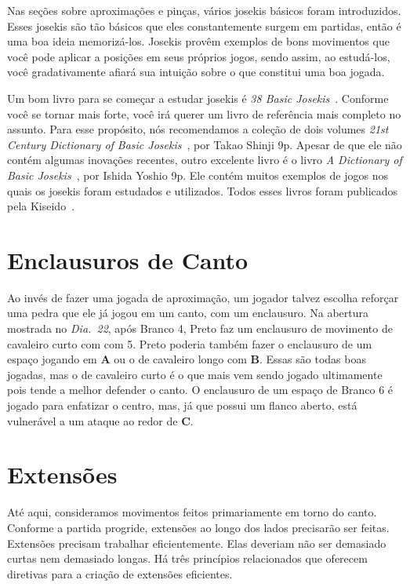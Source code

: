 Nas seções sobre aproximações e pinças, vários josekis básicos foram introduzidos. Esses josekis são tão básicos que eles constantemente surgem em partidas, então é uma boa ideia memorizá-los. Josekis provêm exemplos de bons movimentos que você pode aplicar a posições em seus próprios jogos, sendo assim, ao estudá-los, você gradativamente afiará sua intuição sobre o que constitui uma boa jogada.

Um bom livro para se começar a estudar josekis é \emph{38 Basic Josekis}~\cite{kosugi_bozulich_38_basic_joseki}. Conforme você se tornar mais forte, você irá querer um livro de referência mais completo no assunto. Para esse propósito, nós recomendamos a coleção de dois volumes \emph{21st Century Dictionary of Basic Josekis}~\cite{takao_shinji_21st_century_joseki_dictionary}, por Takao Shinji 9p. Apesar de que ele não contém algumas inovações recentes, outro excelente livro é o livro \emph{A Dictionary of Basic Josekis}~\cite{ishida_yoshio_basic_joseki_dictionary}, por Ishida Yoshio 9p. Ele contém muitos exemplos de jogos nos quais os josekis foram estudados e utilizados. Todos esses livros foram publicados pela Kiseido~\cite{kiseido}.

\section{Enclausuros de Canto}

Ao invés de fazer uma jogada de aproximação, um jogador talvez escolha reforçar uma pedra que ele já jogou em um canto, com um enclausuro. Na abertura mostrada no \emph{Dia.\@~22}, após Branco 4, Preto faz um enclausuro de movimento de cavaleiro curto com com 5. Preto poderia também fazer o enclausuro de um espaço jogando em \textbf{A} ou o de cavaleiro longo com \textbf{B}. Essas são todas boas jogadas, mas o de cavaleiro curto é o que mais vem sendo jogado ultimamente pois tende a melhor defender o canto. O enclausuro de um espaço de Branco 6 é jogado para enfatizar o centro, mas, já que possui um flanco aberto, está vulnerável a um ataque ao redor de \textbf{C}.

\section{Extensões}

Até aqui, consideramos movimentos feitos primariamente em torno do canto. Conforme a partida progride, extensões ao longo dos lados precisarão ser feitas. Extensões precisam trabalhar eficientemente. Elas deveriam não ser demasiado curtas nem demasiado longas. Há três princípios relacionados que oferecem diretivas para a criação de extensões eficientes.

